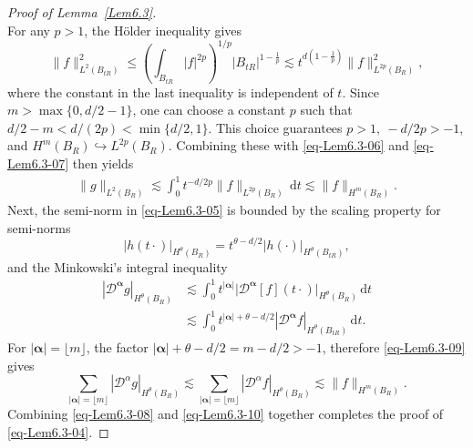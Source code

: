 \documentclass{sn-jnl}%
\newcommand{\nm}[1]{\| #1 \|}
\newcommand{\dt}{\,\mathrm{d}t}
\numberwithin{equation}{section}
\theoremstyle{thmstyleone}%
\theoremstyle{thmstyletwo}%
\theoremstyle{thmstylethree}%
\begin{document}
\begin{appendices}
\begin{proof}[Proof of Lemma~\ref{Lem6.3}]
\begin{equation}
\end{equation}
For any $p>1$, the H\"older inequality gives
\begin{equation}\label{eq-Lem6.3-07}
    \nm{f}_{L^{2}(B_{tR})}^2 \leq \left(\int_{B_{tR}} |f|^{2p}\right)^{1/p}\bigl|B_{tR}\bigr|^{1-\frac{1}{p}}\lesssim t^{d(1-\frac{1}{p})}\|f\|_{L^{2p}(B_R)}^2,
\end{equation}
where the constant in the last inequality is independent of $t$.
Since $m>\max\{0,d/2-1\}$, one can choose a constant $p$ such that 
$d/2-m<d/(2p)<\min\{d/2,1\}$. This choice guarantees $p>1,\ -d/2p>-1$, and $H^m(B_R)\hookrightarrow L^{2p}(B_R)$. Combining these with \eqref{eq-Lem6.3-06} and \eqref{eq-Lem6.3-07} then yields
\begin{equation}\label{eq-Lem6.3-08}
\begin{aligned}
    \|g\|_{L^{2}(B_R)}\lesssim \int_0^1 t^{-d/2p}\|f\|_{L^{2p}(B_R)}\dt \lesssim \|f\|_{H^{m}(B_R)}.
\end{aligned}
\end{equation}
Next, the semi-norm in \eqref{eq-Lem6.3-05} is bounded by
the scaling property for semi-norms
\[
    |h(t\cdot)|_{H^{\theta}(B_R)} = t^{\theta-d/2}| h(\cdot)|_{H^{\theta}(B_{tR})},
\]
and the Minkowski’s integral inequality
\begin{equation}\label{eq-Lem6.3-09}
\begin{aligned}
     |\mathcal{D}^{\bm \alpha}g|_{H^{\theta}(B_R)}
    &\lesssim
    \int_0^1 t^{|\bm \alpha|}\bigl|\mathcal{D}^{\bm \alpha}[f](t \cdot)\bigr|_{H^{\theta}(B_R)}\dt
    \\&\lesssim 
    \int_{0}^{1} t^{|\bm \alpha|+\theta-d/2}|\mathcal{D}^{\bm \alpha}f|_{H^{\theta}(B_{tR})}\dt.
\end{aligned}
\end{equation}
For $|\bm \alpha| =\lfloor m  \rfloor$, the factor $|\bm \alpha|+\theta-d/2= m-d/2>-1$, therefore \eqref{eq-Lem6.3-09} gives
\begin{equation}\label{eq-Lem6.3-10}
    \sum_{|\bm \alpha|=\lfloor m\rfloor}|\mathcal{D}^{\alpha}g|_{H^{\theta}(B_R)}\lesssim \sum_{|\bm \alpha|=\lfloor m\rfloor}|\mathcal{D}^{\alpha}f|_{H^{\theta}(B_R)}\lesssim \|f\|_{H^{m}(B_R)}.
\end{equation}
Combining \eqref{eq-Lem6.3-08} and \eqref{eq-Lem6.3-10} together completes the proof of \eqref{eq-Lem6.3-04}.
\end{proof}



\end{appendices}
\end{document}

